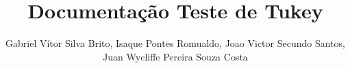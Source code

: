 \documentclass[versao=digital]{tc_ifgoiano_ceres}
\author{Gabriel Vítor Silva Brito, Isaque Pontes Romualdo, Joao Victor Secundo Santos, Juan Wycliffe Pereira Souza Costa}
\title{Documentação Teste de Tukey}
\begin{document}
	
	
	\textual

	
	

\end{document}
